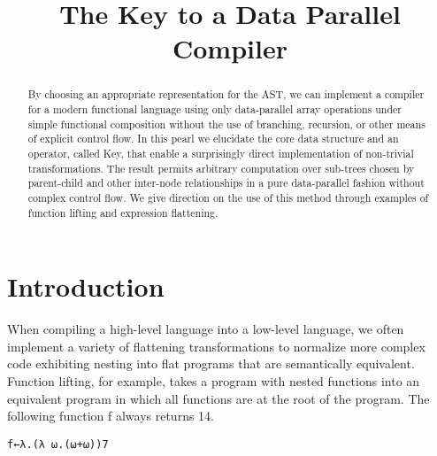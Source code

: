 \documentclass[pldi]{sigplanconf-pldi15}
\begin{document}
\title{The Key to a Data Parallel Compiler}

\maketitle
\begin{abstract}
By choosing an appropriate representation for the AST, we can implement a compiler for a modern functional 
language using only data-parallel array operations under simple functional composition without the use of 
branching, recursion, or other means of explicit control flow. In this pearl we elucidate the core data structure 
and an operator, called Key, that enable a surprisingly direct implementation of non-trivial transformations. 
The result permits arbitrary computation over sub-trees chosen by parent-child and other inter-node 
relationships in a pure data-parallel fashion without complex control flow. We give direction on the use of this 
method through examples of function lifting and expression flattening.
\end{abstract}


\section{Introduction}

When compiling a high-level language into a low-level language, we often implement a variety of 
flattening transformations to normalize more complex code exhibiting nesting into flat programs 
that are semantically equivalent. Function lifting, for example, takes a program with nested functions 
into an equivalent program in which all functions are at the root of the program. The following function
f always returns 14.

\begin{verbatim}
f←λ.(λ ⍵.(⍵+⍵))7
\end{verbatim}
\end{document}
